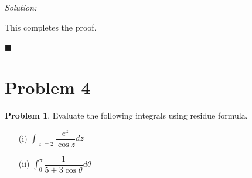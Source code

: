 \documentclass[12pt]{article}
\theoremstyle{definition}
\newtheorem*{prb}{Problem}
\newenvironment{problem}{
\begin{tcolorbox}[colback=blue!5!white,colframe=blue!75!black, parbox = true] \begin{prb}  }{\end{prb}\end{tcolorbox} }
\newenvironment{answer}{\textit{Solution: }\quad }{ \hfill $\blacksquare$}
\numberwithin{equation}{section}
\begin{document}
\begin{answer}
\begin{enumerate}
		This completes the proof.
	\end{enumerate}





\end{answer}


\pagebreak

\section{Problem 4}
\begin{problem}
	Evaluate the following integrals using residue formula.
	\begin{enumerate}
		\item[(i)] $\int_{|z| = 2} \dfrac{e^z}{\cos z}dz$
		\item[(ii)] $\int_{0}^{\pi} \dfrac{1}{5 + 3 \cos \theta} d\theta$ 
	\end{enumerate}
\end{problem}
\end{document}
